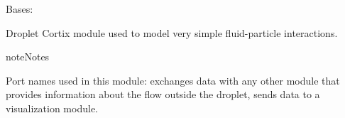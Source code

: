 \documentclass[letterpaper,10pt,openany,oneside,english]{sphinxmanual}
\begin{document}
\begin{fulllineitems}
\label{\detokenize{examples_rst/droplet:droplet.Droplet}}
Bases: 

Droplet Cortix module used to model very simple fluid-particle interactions.

\begin{sphinxadmonition}{note}{Notes}

Port names used in this module:  exchanges data with any other
module that provides information about the flow outside the droplet,
 sends data to a visualization module.
\end{sphinxadmonition}

\begin{fulllineitems}
\label{\detokenize{examples_rst/droplet:droplet.Droplet.__init__}}~

\begin{fulllineitems}
\label{\detokenize{examples_rst/droplet:droplet.Droplet.initial_time}}

\end{fulllineitems}


\begin{fulllineitems}
\label{\detokenize{examples_rst/droplet:droplet.Droplet.end_time}}

\end{fulllineitems}


\begin{fulllineitems}
\label{\detokenize{examples_rst/droplet:droplet.Droplet.time_step}}

\end{fulllineitems}



\end{fulllineitems}
\end{fulllineitems}
\end{document}
